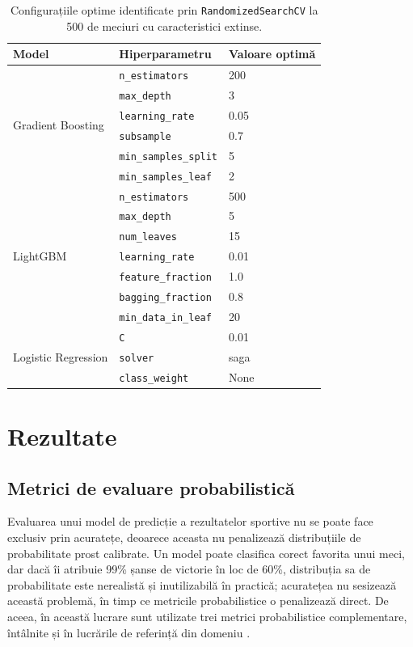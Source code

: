 \begin{table}[htbp]
\centering
\begin{tabular}{|l|l|l|}
\hline
\textbf{Model} & \textbf{Hiperparametru} & \textbf{Valoare optimă} \\
\hline
\multirow{6}{*}{Gradient Boosting}
  & \texttt{n\_estimators}       & 200 \\
  & \texttt{max\_depth}          & 3 \\
  & \texttt{learning\_rate}      & 0.05 \\
  & \texttt{subsample}           & 0.7 \\
  & \texttt{min\_samples\_split} & 5 \\
  & \texttt{min\_samples\_leaf}  & 2 \\
\hline
\multirow{7}{*}{LightGBM}
  & \texttt{n\_estimators}       & 500 \\
  & \texttt{max\_depth}          & 5 \\
  & \texttt{num\_leaves}         & 15 \\
  & \texttt{learning\_rate}      & 0.01 \\
  & \texttt{feature\_fraction}   & 1.0 \\
  & \texttt{bagging\_fraction}   & 0.8 \\
  & \texttt{min\_data\_in\_leaf} & 20 \\
\hline
\multirow{3}{*}{Logistic Regression}
  & \texttt{C}                   & 0.01 \\
  & \texttt{solver}              & saga \\
  & \texttt{class\_weight}       & None \\
\hline
\end{tabular}
\caption{Configurațiile optime identificate prin
         \texttt{RandomizedSearchCV} la 500 de meciuri cu caracteristici
         extinse.}
\label{tab:hyperparams}
\end{table}

\section{Rezultate}
\label{sec:comparatie_modele}

\subsection{Metrici de evaluare probabilistică}
\label{sec:metrici}

Evaluarea unui model de predicție a rezultatelor sportive nu se poate face
exclusiv prin acuratețe, deoarece aceasta nu penalizează distribuțiile de
probabilitate prost calibrate. Un model poate clasifica corect favorita
unui meci, dar dacă îi atribuie 99\% șanse de victorie în loc de 60\%,
distribuția sa de probabilitate este nerealistă și inutilizabilă în
practică; acuratețea nu sesizează această problemă, în timp ce metricile
probabilistice o penalizează direct. De aceea, în această lucrare sunt
utilizate trei metrici probabilistice complementare, întâlnite și în
lucrările de referință din domeniu \cite{Robberechts2019, Hill2022}.

